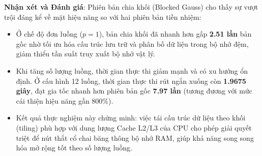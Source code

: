 \textbf{Nhận xét và Đánh giá}:
Phiên bản chia khối (Blocked Gauss) cho thấy sự vượt trội đáng kể về mặt hiệu năng so với hai phiên bản tiền nhiệm:
\begin{itemize}
    \item Ở chế độ đơn luồng ($p=1$), bản chia khối đã nhanh hơn gấp \textbf{2.51 lần} bản gốc nhờ tối ưu hóa cấu trúc lưu trữ và phân bố dữ liệu trong bộ nhớ đệm, giảm thiểu tần suất truy xuất bộ nhớ vật lý.
    \item Khi tăng số lượng luồng, thời gian thực thi giảm mạnh và có xu hướng ổn định. Ở cấu hình 12 luồng, thời gian thực thi rút ngắn xuống còn \textbf{1.9675 giây}, đạt gia tốc nhanh hơn phiên bản gốc \textbf{7.97 lần} (tương đương với mức cải thiện hiệu năng gần 800\%).
    \item Kết quả thực nghiệm này chứng minh: việc tái cấu trúc dữ liệu theo khối (tiling) phù hợp với dung lượng Cache L2/L3 của CPU cho phép giải quyết triệt để nút thắt cổ chai băng thông bộ nhớ RAM, giúp khả năng song song hóa mở rộng tốt theo số lượng luồng.
\end{itemize}

